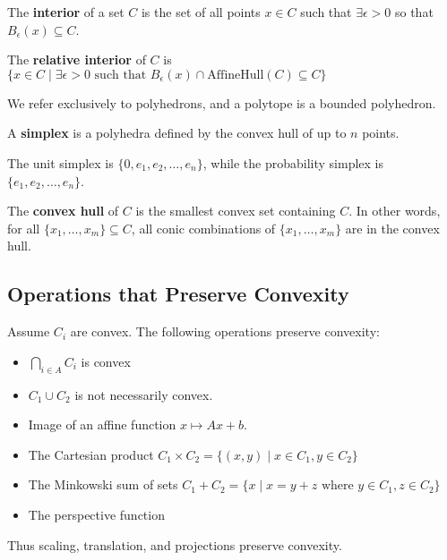 \documentclass[english, 11pt]{article}
\begin{document}
\begin{defn}
The {\bf interior} of a set $C$ is the set of all points $x \in C$ such that $\exists \epsilon>0$ so that $B_\epsilon(x) \subseteq C$.
\end{defn}

\begin{defn}
The {\bf relative interior} of $C$ is $\{x \in C \mid \exists \epsilon>0 \text{ such that } B_\epsilon(x) \cap \text{AffineHull}(C) \subseteq C \}$\end{defn}


\begin{rem}
We refer exclusively to polyhedrons, and a polytope is a bounded polyhedron.
\end{rem}

\begin{defn}
A {\bf simplex} is a polyhedra defined by the convex hull of up to $n$ points.
\end{defn}

\begin{exmp} The unit simplex is $\{0,e_1,e_2,\dots,e_n\}$, while the probability simplex is $\{e_1,e_2,\dots,e_n\}$.
\end{exmp}

\begin{defn}
The {\bf convex hull} of $C$ is the smallest convex set containing $C$. In other words, for all $\{x_1,\dots,x_m\} \subseteq C$, all conic combinations of $\{x_1,\dots,x_m\}$ are in the convex hull.
\end{defn}

\subsection{Operations that Preserve Convexity}
Assume $C_i$ are convex. The following operations preserve convexity:
\begin{itemize}
\item $\bigcap \limits_{i \in A} C_i$ is convex
\item $C_1 \cup C_2$ is not necessarily convex.
\item Image of an affine function $x \mapsto Ax+b$.
\item The Cartesian product $C_1 \times C_2 = \{(x,y) \mid x \in C_1, y \in C_2 \}$
\item The Minkowski sum of sets $C_1 + C_2 = \{x \mid x = y+z \text{ where } y \in C_1, z \in C_2 \}$
\item The perspective function
\end{itemize}
Thus scaling, translation, and projections preserve convexity.
\end{document}
